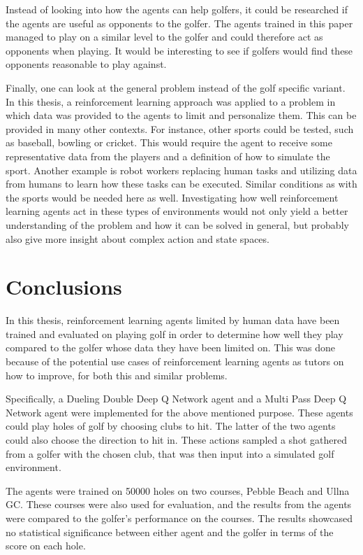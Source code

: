 \documentclass{kththesis}
\begin{document}
Instead of looking into how the agents can help golfers, it could be researched if the agents are useful as opponents to the golfer. The agents trained in this paper managed to play on a similar level to the golfer and could therefore act as opponents when playing. It would be interesting to see if golfers would find these opponents reasonable to play against.

Finally, one can look at the general problem instead of the golf specific variant. In this thesis, a reinforcement learning approach was applied to a problem in which data was provided to the agents to limit and personalize them. This can be provided in many other contexts. For instance, other sports could be tested, such as baseball, bowling or cricket. This would require the agent to receive some representative data from the players and a definition of how to simulate the sport. Another example is robot workers replacing human tasks and utilizing data from humans to learn how these tasks can be executed. Similar conditions as with the sports would be needed here as well. Investigating how well reinforcement learning agents act in these types of environments would not only yield a better understanding of the problem and how it can be solved in general, but probably also give more insight about complex action and state spaces.

\chapter{Conclusions}
\label{chapter:conclusions}
In this thesis, reinforcement learning agents limited by human data have been trained and evaluated on playing golf in order to determine how well they play compared to the golfer whose data they have been limited on. This was done because of the potential use cases of reinforcement learning agents as tutors on how to improve, for both this and similar problems.

Specifically, a Dueling Double Deep Q Network agent and a Multi Pass Deep Q Network agent were implemented for the above mentioned purpose. These agents could play holes of golf by choosing clubs to hit. The latter of the two agents could also choose the direction to hit in. These actions sampled a shot gathered from a golfer with the chosen club, that was then input into a simulated golf environment. 

The agents were trained on 50000 holes on two courses, Pebble Beach and Ullna GC. These courses were also used for evaluation, and the results from the agents were compared to the golfer's performance on the courses. The results showcased no statistical significance between either agent and the golfer in terms of the score on each hole.
\end{document}
